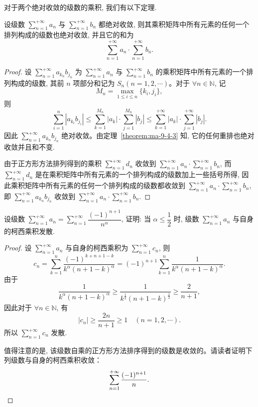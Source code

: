 对于两个绝对收敛的级数的乘积, 我们有以下定理.

\begin{theorem}\label{theorem:ma-9-4-5}
设级数 $\sum\limits_{n=1}^{+\infty}a_n$ 与 $\sum\limits_{n=1}^{+\infty}b_n$ 都绝对收敛, 则其乘积矩阵中所有元素的任何一个排列构成的级数也绝对收敛, 并且它的和为
\[
  \sum_{n=1}^{+\infty}a_n\cdot\sum_{n=1}^{+\infty}b_n.
\]
\end{theorem}


\begin{proof}
设 $\sum\limits_{n=1}^{+\infty}a_{k_n}b_{j_n}$ 为 $\sum\limits_{n=1}^{+\infty}a_n$ 与 $\sum\limits_{n=1}^{+\infty}b_n$ 的乘积矩阵中所有元素的一个排列构成的级数, 其前 $n$ 项部分和记为 $S_n(n=1,2,\cdots)$。对于 $\forall n\in\mathbb{N}$, 记
\[
  M_n=\max_{1\leq i\leq n}\{k_i,j_i\},
\]
则
\[
  \sum_{i=1}^n|a_{k_i}b_{j_i}|
  \leq\sum_{k=1}^{M_n}|a_k|\cdot\sum_{j=1}^{M_n}|b_j|
  \leq\sum_{k=1}^{+\infty}|a_k|\cdot\sum_{j=1}^{+\infty}|b_j|.
\]
因此 $\sum\limits_{n=1}^{+\infty}a_{k_n}b_{j_n}$ 绝对收敛。由定理~\ref{theorem:ma-9-4-3} 知, 它的任何重排也绝对收敛并且和不变.

由于正方形方法排列得到的乘积 $\sum\limits_{n=1}^{+\infty}d_n$ 收敛到 $\sum\limits_{n=1}^{+\infty}a_n\cdot\sum\limits_{n=1}^{+\infty}b_n$, 而 $\sum\limits_{n=1}^{+\infty}d_n$ 是在乘积矩阵中所有元素的一个排列构成的级数加上一些括号所得, 因此乘积矩阵中所有元素的任何一个排列构成的级数都收敛到 $\sum\limits_{n=1}^{+\infty}a_n\cdot\sum\limits_{n=1}^{+\infty}b_n$, 即 $\sum\limits_{n=1}^{+\infty}a_{k_n}b_{j_n}$ 收敛到 $\sum\limits_{n=1}^{+\infty}a_n\cdot\sum\limits_{n=1}^{+\infty}b_n$.
\end{proof}


\begin{example}\label{example:ma-9-4-1}
设级数 $\sum\limits_{n=1}^{+\infty}a_n=\sum\limits_{n=1}^{+\infty}\dfrac{(-1)^{n+1}}{n^\alpha}$, 证明: 当 $\alpha\leq\dfrac12$ 时, 级数 $\sum\limits_{n=1}^{+\infty}a_n$ 与自身的柯西乘积发散.
\end{example}


\begin{proof}
设 $\sum\limits_{n=1}^{+\infty}a_n$ 与自身的柯西乘积为 $\sum\limits_{n=1}^{+\infty}c_n$, 则
\[
  c_n=\sum_{k=1}^n\frac{(-1)^{k+n+1-k}}{k^\alpha(n+1-k)^\alpha}
  =(-1)^{n+1}\sum_{k=1}^n\frac1{k^\alpha(n+1-k)^\alpha}.
\]
由于
\[
  \frac1{k^\alpha(n+1-k)^\alpha}
  \geq\frac1{k^{\frac12}(n+1-k)^{\frac12}}
  \geq\frac2{n+1},
\]
因此对于 $\forall n\in\mathbb{N}$, 有
\[
  |c_n|\geq\frac{2n}{n+1}\geq1\quad(n=1,2,\cdots).
\]
所以 $\sum\limits_{n=1}^{+\infty}c_n$ 发散.

值得注意的是, 该级数自乘的正方形方法排序得到的级数是收敛的。请读者证明下列级数与自身的柯西乘积收敛：
\[\sum_{n=1}^{+\infty}\frac{(-1)^{n+1}}{n}.\qedhere
\]
\end{proof}


